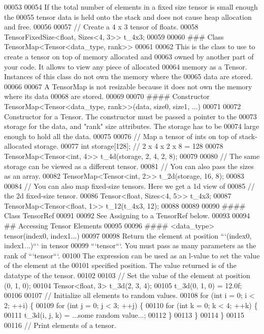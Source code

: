 \begin{DoxyCode}
00053 
00054 If the total number of elements in a fixed size tensor is small enough the
00055 tensor data is held onto the stack and does not cause heap allocation and free.
00056 
00057     // Create a 4 x 3 tensor of floats.
00058     TensorFixedSize<float, Sizes<4, 3>> t\_4x3;
00059 
00060 ### Class TensorMap<Tensor<data\_type, rank>>
00061 
00062 This is the class to use to create a tensor on top of memory allocated and
00063 owned by another part of your code.  It allows to view any piece of allocated
00064 memory as a Tensor.  Instances of this class do not own the memory where the
00065 data are stored.
00066 
00067 A TensorMap is not resizable because it does not own the memory where its data
00068 are stored.
00069 
00070 #### Constructor TensorMap<Tensor<data\_type, rank>>(data, size0, size1, ...)
00071 
00072 Constructor for a Tensor.  The constructor must be passed a pointer to the
00073 storage for the data, and "rank" size attributes.  The storage has to be
00074 large enough to hold all the data.
00075 
00076     // Map a tensor of ints on top of stack-allocated storage.
00077     int storage[128];  // 2 x 4 x 2 x 8 = 128
00078     TensorMap<Tensor<int, 4>> t\_4d(storage, 2, 4, 2, 8);
00079 
00080     // The same storage can be viewed as a different tensor.
00081     // You can also pass the sizes as an array.
00082     TensorMap<Tensor<int, 2>> t\_2d(storage, 16, 8);
00083 
00084     // You can also map fixed-size tensors.  Here we get a 1d view of
00085     // the 2d fixed-size tensor.
00086     Tensor<float, Sizes<4, 5>> t\_4x3;
00087     TensorMap<Tensor<float, 1>> t\_12(t\_4x3, 12);
00088 
00089 
00090 #### Class TensorRef
00091 
00092 See Assigning to a TensorRef below.
00093 
00094 ## Accessing Tensor Elements
00095 
00096 #### <data\_type> tensor(index0, index1...)
00097 
00098 Return the element at position ```(index0, index1...)``` in tensor
00099 ```tensor```.  You must pass as many parameters as the rank of ```tensor```.
00100 The expression can be used as an l-value to set the value of the element at the
00101 specified position.  The value returned is of the datatype of the tensor.
00102 
00103     // Set the value of the element at position (0, 1, 0);
00104     Tensor<float, 3> t\_3d(2, 3, 4);
00105     t\_3d(0, 1, 0) = 12.0f;
00106 
00107     // Initialize all elements to random values.
00108     for (int i = 0; i < 2; ++i) \{
00109       for (int j = 0; j < 3; ++j) \{
00110         for (int k = 0; k < 4; ++k) \{
00111           t\_3d(i, j, k) = ...some random value...;
00112         \}
00113       \}
00114     \}
00115 
00116     // Print elements of a tensor.

\end{DoxyCode}
